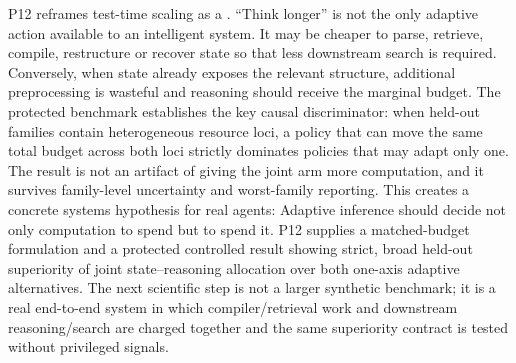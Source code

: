 \markdownRendererDocumentBegin
\markdownRendererSectionBegin
{}\markdownRendererInterblockSeparator
{}P12 reframes test-time scaling as a . “Think longer” is not the only adaptive action available to an intelligent system. It may be cheaper to parse, retrieve, compile, restructure or recover state so that less downstream search is required. Conversely, when state already exposes the relevant structure, additional preprocessing is wasteful and reasoning should receive the marginal budget.\markdownRendererInterblockSeparator
{}The protected benchmark establishes the key causal discriminator: when held-out families contain heterogeneous resource loci, a policy that can move the same total budget across both loci strictly dominates policies that may adapt only one. The result is not an artifact of giving the joint arm more computation, and it survives family-level uncertainty and worst-family reporting.\markdownRendererInterblockSeparator
{}This creates a concrete systems hypothesis for real agents: \markdownRendererInterblockSeparator
{}Adaptive inference should decide not only  computation to spend but  to spend it. P12 supplies a matched-budget formulation and a protected controlled result showing strict, broad held-out superiority of joint state–reasoning allocation over both one-axis adaptive alternatives. The next scientific step is not a larger synthetic benchmark; it is a real end-to-end system in which compiler/retrieval work and downstream reasoning/search are charged together and the same superiority contract is tested without privileged signals.
\markdownRendererSectionEnd \markdownRendererDocumentEnd